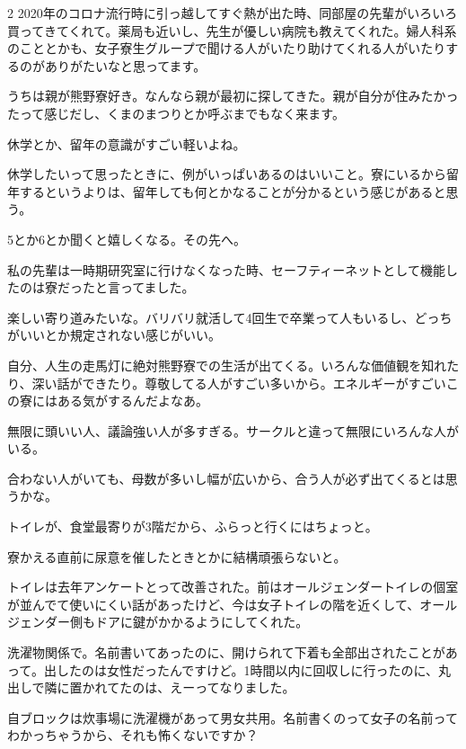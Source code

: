 \begin{multicols}{2}
 2020年のコロナ流行時に引っ越してすぐ熱が出た時、同部屋の先輩がいろいろ買ってきてくれて。薬局も近いし、先生が優しい病院も教えてくれた。婦人科系のこととかも、女子寮生グループで聞ける人がいたり助けてくれる人がいたりするのがありがたいなと思ってます。

 うちは親が熊野寮好き。なんなら親が最初に探してきた。親が自分が住みたかったって感じだし、くまのまつりとか呼ぶまでもなく来ます。

 休学とか、留年の意識がすごい軽いよね。

 休学したいって思ったときに、例がいっぱいあるのはいいこと。寮にいるから留年するというよりは、留年しても何とかなることが分かるという感じがあると思う。

 5とか6とか聞くと嬉しくなる。その先へ。

 私の先輩は一時期研究室に行けなくなった時、セーフティーネットとして機能したのは寮だったと言ってました。

 楽しい寄り道みたいな。バリバリ就活して4回生で卒業って人もいるし、どっちがいいとか規定されない感じがいい。

 自分、人生の走馬灯に絶対熊野寮での生活が出てくる。いろんな価値観を知れたり、深い話ができたり。尊敬してる人がすごい多いから。エネルギーがすごいこの寮にはある気がするんだよなあ。

 無限に頭いい人、議論強い人が多すぎる。サークルと違って無限にいろんな人がいる。

 合わない人がいても、母数が多いし幅が広いから、合う人が必ず出てくるとは思うかな。


 トイレが、食堂最寄りが3階だから、ふらっと行くにはちょっと。

 寮かえる直前に尿意を催したときとかに結構頑張らないと。

 トイレは去年アンケートとって改善された。前はオールジェンダートイレの個室が並んでて使いにくい話があったけど、今は女子トイレの階を近くして、オールジェンダー側もドアに鍵がかかるようにしてくれた。

 洗濯物関係で。名前書いてあったのに、開けられて下着も全部出されたことがあって。出したのは女性だったんですけど。1時間以内に回収しに行ったのに、丸出しで隣に置かれてたのは、えーってなりました。

 自ブロックは炊事場に洗濯機があって男女共用。名前書くのって女子の名前ってわかっちゃうから、それも怖くないですか？


\end{multicols}
